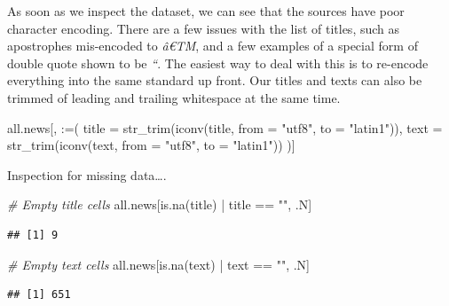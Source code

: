 \documentclass[
]{article}
\newenvironment{Shaded}{\begin{snugshade}}{\end{snugshade}}
\newcommand{\AttributeTok}[1]{\textcolor[rgb]{0.77,0.63,0.00}{#1}}
\newcommand{\CommentTok}[1]{\textcolor[rgb]{0.56,0.35,0.01}{\textit{#1}}}
\newcommand{\FunctionTok}[1]{\textcolor[rgb]{0.00,0.00,0.00}{#1}}
\newcommand{\NormalTok}[1]{#1}
\newcommand{\SpecialCharTok}[1]{\textcolor[rgb]{0.00,0.00,0.00}{#1}}
\newcommand{\StringTok}[1]{\textcolor[rgb]{0.31,0.60,0.02}{#1}}
\begin{document}
As soon as we inspect the dataset, we can see that the sources have poor
character encoding. There are a few issues with the list of titles, such
as apostrophes mis-encoded to \emph{â€TM}, and a few examples of a
special form of double quote shown to be \emph{``}. The easiest way to
deal with this is to re-encode everything into the same standard up
front. Our titles and texts can also be trimmed of leading and trailing
whitespace at the same time.

\begin{Shaded}
\begin{Highlighting}[]
\NormalTok{all.news[, }\StringTok{\textasciigrave{}}\AttributeTok{:=}\StringTok{\textasciigrave{}}\NormalTok{(}
    \AttributeTok{title =} \FunctionTok{str\_trim}\NormalTok{(}\FunctionTok{iconv}\NormalTok{(title, }\AttributeTok{from =} \StringTok{"utf8"}\NormalTok{, }\AttributeTok{to =} \StringTok{"latin1"}\NormalTok{)),}
    \AttributeTok{text =} \FunctionTok{str\_trim}\NormalTok{(}\FunctionTok{iconv}\NormalTok{(text, }\AttributeTok{from =} \StringTok{"utf8"}\NormalTok{, }\AttributeTok{to =} \StringTok{"latin1"}\NormalTok{))}
\NormalTok{)]}
\end{Highlighting}
\end{Shaded}

Inspection for missing data\ldots.

\begin{Shaded}
\begin{Highlighting}[]
\CommentTok{\# Empty title cells}
\NormalTok{all.news[}\FunctionTok{is.na}\NormalTok{(title) }\SpecialCharTok{|}\NormalTok{ title }\SpecialCharTok{==} \StringTok{""}\NormalTok{, .N]}
\end{Highlighting}
\end{Shaded}

\begin{verbatim}
## [1] 9
\end{verbatim}

\begin{Shaded}
\begin{Highlighting}[]
\CommentTok{\# Empty text cells}
\NormalTok{all.news[}\FunctionTok{is.na}\NormalTok{(text) }\SpecialCharTok{|}\NormalTok{ text }\SpecialCharTok{==} \StringTok{""}\NormalTok{, .N]}
\end{Highlighting}
\end{Shaded}

\begin{verbatim}
## [1] 651
\end{verbatim}
\end{document}
